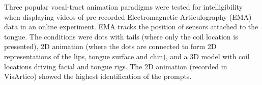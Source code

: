 Three popular vocal-tract animation paradigms were tested for intelligibility when displaying videos of pre-recorded Electromagnetic Articulography (EMA) data in an online experiment. EMA tracks the position of sensors attached to the tongue. The conditions were dots with tails (where only the coil location is presented), 2D animation (where the dots are connected to form 2D representations of the lips, tongue surface and chin), and a 3D model with coil locations driving facial and tongue rigs. The 2D animation (recorded in VisArtico) showed the highest identification of the prompts.

